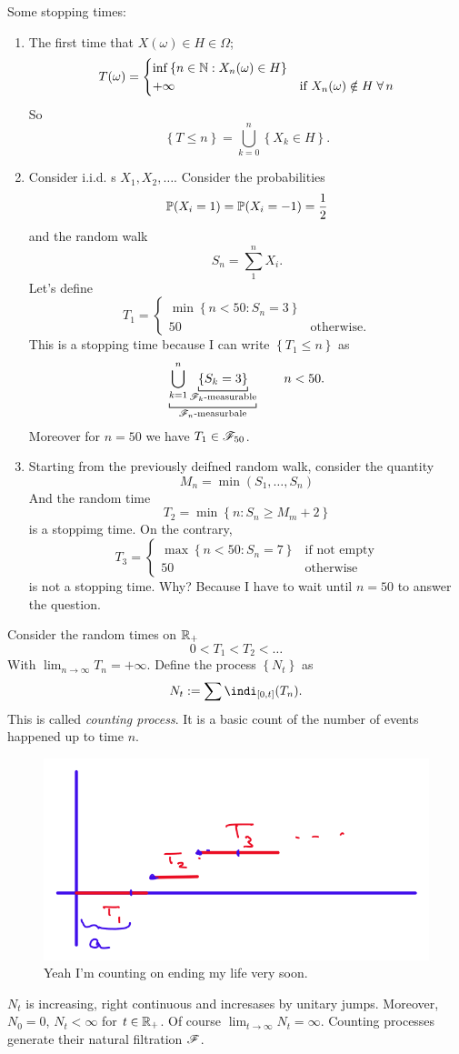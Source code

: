 \documentclass{report}
\begin{document}
\begin{example}
	Some stopping times:
	\begin{enumerate}[\circnum]
		\item The first time that $X(\omega)\in H\in\Omega$;
		\[T(\omega)=\begin{cases}
			\inf \left\{n\in\mathbb{N}:X_n(\omega)\in H\right\}&\\
			+\infty&\text{if $X_n(\omega)\notin H\;\forall\, n$}
		\end{cases}\]
		So
		\[\left\{T\leq n\right\}=\bigcup_{k=0}^{n}\left\{X_k\in H\right\}.\]
		\item Consider i.i.d. \rv{}s 
		$X_1,X_2,\ldots$. Consider the probabilities
		\[\mathbb{P}(X_i=1)=\mathbb{P}(X_i=-1)=\frac{1}{2}\]
		and the random walk
		\[S_n=\sum_{1}^{n}X_i.\]
		Let's define 
		\[T_1=\begin{cases}
			\min\left\{n<50:S_n=3\right\}\\
			50 &\text{otherwise}.
		\end{cases}\]
		This is a stopping time because I can write $\left\{T_1\leq n\right\}$ as $$\underbracket[0.6pt]{\bigcup_{k=1}^{n}\underbracket[0.6pt]{\left\{S_k=3\right\}}_{\text{$\F_k$-measurable}}}_{\mathclap{\text{$\F_n$-measurbale}}}\qquad n<50.$$
		Moreover for $n=50$ we have $T_{1}\in\mathscr{F}_{50}$.
		\item Starting from the previously deifned random walk, consider the quantity 
		\[M_n=\min(S_1,\ldots,S_n)\]
		And the random time
		\[T_2=\min\left\{n:S_n\geq M_m+2\right\}\]
		is a stoppimg time. On the contrary, 
		\[T_3=\begin{cases}
			\max\left\{n<50:S_n=7\right\}&\text{if not empty}\\
			50 &\text{otherwise}
		\end{cases}\]
		is not a stopping time. Why? Because I have to wait until $n=50$ to answer the question. 
	\end{enumerate}
\end{example}

Consider the random times on $\mathbb{R}_+$
\[0<T_1<T_2<\ldots\]
With $\lim_{n\to\infty}T_n=+\infty$. Define the process $\left\{N_t\right\}$ as 
\[N_t:=\sum\indi_{[0,t]}(T_n).\]
This is called \emph{counting process}. It is a basic count of the number of events happened up to time $n$.
\begin{figure}[H]
	\centering
	\includegraphics[width=0.6\linewidth]{screenshot010}
	\caption{Yeah I'm counting on ending my life very soon.}
	\label{fig:screenshot010}
\end{figure}
$N_{t}$ is increasing, right continuous and incresases by unitary jumps. Moreover, $N_0=0$, $N_t<\infty$ for $t\in\mathbb{R}_+$. Of course $\lim_{t\to\infty}N_t=\infty$. Counting processes generate their natural filtration $\mathscr{F}$.
\end{document}
